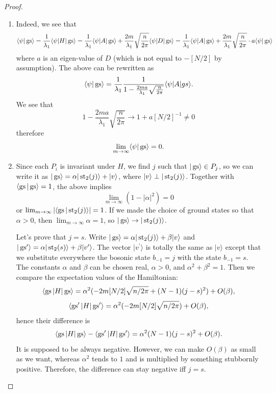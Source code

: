 \begin{proof}
\begin{enumerate}
\item Indeed, we see that
\[
\langle \psi | \operatorname{gs} \rangle = \frac{1}{\lambda_1} \langle \psi | H|\operatorname{gs}\rangle = \frac{1}{\lambda_1} \langle \psi |A|\operatorname{gs}\rangle + \frac{2m}{\lambda_1} \sqrt{\frac{n}{2\pi}} \langle \psi | D | \operatorname{gs} \rangle = \frac{1}{\lambda_1} \langle \psi |A|\operatorname{gs}\rangle + \frac{2m}{\lambda_1} \sqrt{\frac{n}{2\pi}} \cdot a \langle \psi | \operatorname{gs} \rangle
\]
where $a$ is an eigen-value of $D$ (which is not equal to $-[N/2]$ by assumption). The above can be rewritten as
\[
\langle \psi | \operatorname{gs}\rangle = \frac{1}{\lambda_1} \frac{1}{1- \frac{2ma}{\lambda_1}\sqrt{\frac{n}{2\pi}} } \langle \psi | A | gs\rangle.
\]
We see that 
\[
1- \frac{2ma}{\lambda_1}\sqrt{\frac{n}{2\pi}} \rightarrow 1 + a [N/2]^{-1} \neq 0
\]
therefore
\[
\lim_{m \rightarrow \infty}\langle \psi | \operatorname{gs} \rangle = 0.
\]
\item Since each $P_i$ is invariant under $H$, we find $j$ such that $|\operatorname{gs} \rangle \in P_j$, so we can write it as $|\operatorname{gs}\rangle = \alpha |\operatorname{st}_2(j)\rangle + |v\rangle$, where $|v\rangle \perp |\operatorname{st}_2(j)\rangle$. Together with $\langle \operatorname{gs} | \operatorname{gs} \rangle = 1$, the above implies
\[
\lim_{m \rightarrow \infty} (1 - |\alpha|^2) = 0
\]
or $\lim_{m \rightarrow \infty} |\langle \operatorname{gs} |\operatorname{st}_2(j)\rangle| = 1$. If we made the choice of ground states so that $\alpha > 0$, then $\lim_{m\rightarrow \infty} \alpha = 1$, so $|\operatorname{gs}\rangle \rightarrow |\operatorname{st}_2(j)\rangle$.

Let's prove that $j = s$. Write $|\operatorname{gs}\rangle = \alpha |\operatorname{st}_2(j)\rangle + \beta |v\rangle$ and $|\operatorname{gs}^\prime\rangle = \alpha |\operatorname{st}_2(s)\rangle + \beta |v^\prime \rangle$. The vector $|v^\prime \rangle$ is totally the same as $|v\rangle$ except that we substitute everywhere the bosonic state $b_{-1} = j$ with the state $b_{-1} = s$. The constants $\alpha$ and $\beta$ can be chosen real, $\alpha > 0$, and $\alpha^2+\beta^2 = 1$. Then we compare the expectation values of the Hamiltonian:
\[
\langle \operatorname{gs} | H|\operatorname{gs} \rangle  = \alpha^2 (-2m[N/2] \sqrt{n/2\pi} + (N-1)(j-s)^2) + O(\beta),
\]
\[
\langle \operatorname{gs}^\prime | H|\operatorname{gs}^\prime \rangle  = \alpha^2 (-2m[N/2] \sqrt{n/2\pi}) + O(\beta),
\]
hence their difference is
\[
\langle \operatorname{gs} | H|\operatorname{gs} \rangle - \langle \operatorname{gs}^\prime | H|\operatorname{gs}^\prime \rangle = \alpha^2(N-1)(j-s)^2 + O(\beta).
\]
It is supposed to be always negative. However, we can make $O(\beta)$ as small as we want, whereas $\alpha^2$ tends to $1$ and is multiplied by something stubbornly positive. Therefore, the difference can stay negative iff $j = s$.
\end{enumerate}
\end{proof}

